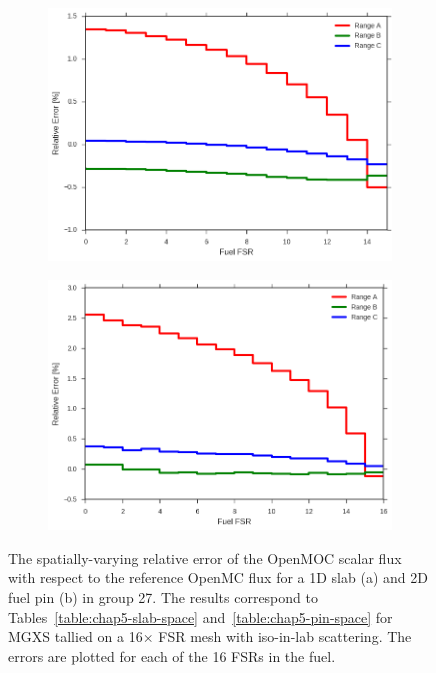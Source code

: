 \begin{figure}[H]
\begin{subfigure}{.9\textwidth}
  \centering
  \includegraphics[width=\linewidth]{figures/biases/slab/rel-err-fuel-fsrs}
  \caption{}
\end{subfigure}
\begin{subfigure}{.9\textwidth}
  \centering
  \includegraphics[width=\linewidth]{figures/biases/pin-cell/rel-err-fuel-fsrs}
  \caption{}
\end{subfigure}
\caption[Flux relative error by FSR]{The spatially-varying relative error of the OpenMOC scalar flux with respect to the reference OpenMC flux for a 1D slab (a) and 2D fuel pin (b) in group 27. The results correspond to Tables~\ref{table:chap5-slab-space} and~\ref{table:chap5-pin-space} for \ac{MGXS} tallied on a 16$\times$ \ac{FSR} mesh with iso-in-lab scattering. The errors are plotted for each of the 16 \ac{FSR}s in the fuel.}
\label{fig:chap5-rel-err-space}
\end{figure}

